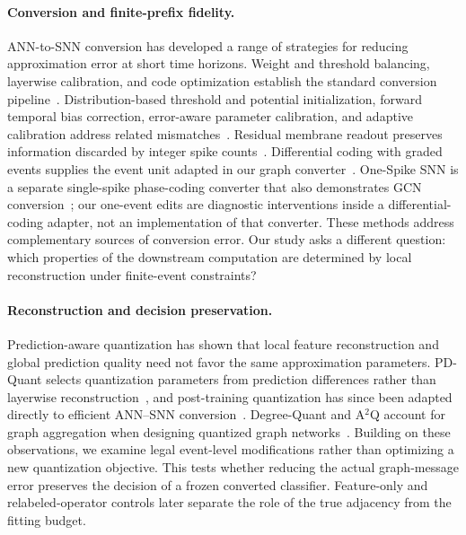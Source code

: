 \documentclass[10pt,twocolumn,letterpaper]{article}
\begin{document}
\paragraph{Conversion and finite-prefix fidelity.}
ANN-to-SNN conversion has developed a range of strategies for reducing approximation error at short time horizons. Weight and threshold balancing, layerwise calibration, and code optimization establish the standard conversion pipeline~\cite{diehl2015,rueckauer2017,li2021,liu2022spikeconverter}. Distribution-based threshold and potential initialization, forward temporal bias correction, error-aware parameter calibration, and adaptive calibration address related mismatches~\cite{bojkovic2024,wu2024ftbc,li2024erroraware,wang2025adaptivecalibration}. Residual membrane readout preserves information discarded by integer spike counts~\cite{sengupta2019,han2020rmp,hao2023residual}. Differential coding with graded events supplies the event unit adapted in our graph converter~\cite{huang2025}. One-Spike SNN is a separate single-spike phase-coding converter that also demonstrates GCN conversion~\cite{hwang2025onespike}; our one-event edits are diagnostic interventions inside a differential-coding adapter, not an implementation of that converter. These methods address complementary sources of conversion error. Our study asks a different question: which properties of the downstream computation are determined by local reconstruction under finite-event constraints?

\paragraph{Reconstruction and decision preservation.}
Prediction-aware quantization has shown that local feature reconstruction and global prediction quality need not favor the same approximation parameters. PD-Quant selects quantization parameters from prediction differences rather than layerwise reconstruction~\cite{liu2023pdquant}, and post-training quantization has since been adapted directly to efficient ANN--SNN conversion~\cite{sun2025posttraining}. Degree-Quant and A$^2$Q account for graph aggregation when designing quantized graph networks~\cite{degreequant2021,a2q2023}. Building on these observations, we examine legal event-level modifications rather than optimizing a new quantization objective. This tests whether reducing the actual graph-message error preserves the decision of a frozen converted classifier. Feature-only and relabeled-operator controls later separate the role of the true adjacency from the fitting budget.
\end{document}
